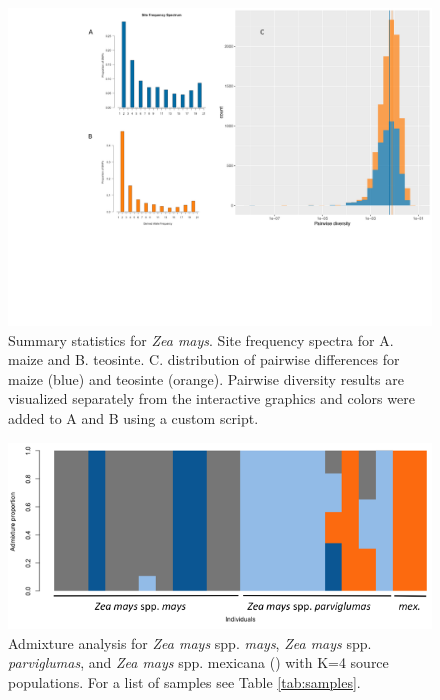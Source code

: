 \documentclass[10pt,a4paper]{article}
\newcommand{\jri}[1]{\todo[size=\scriptsize, color=flame]{#1}}
\begin{document}
\begin{figure}
\centering
\includegraphics[width=\linewidth]{figures/figure3big.pdf}
\caption{Summary statistics for {\it Zea mays}. Site frequency spectra for A. maize and B. teosinte. C. distribution of pairwise differences for maize (blue) and teosinte (orange). Pairwise diversity results are visualized separately from the interactive graphics and colors were added to A and B using a custom script.}
\label{fig:figure3}
\end{figure}

\begin{figure}
\centering
\includegraphics[width=\linewidth]{figures/mt4labeled.png}
\caption{Admixture analysis for {\it Zea mays} spp. {\it mays}, {\it Zea mays} spp. {\it parviglumas}, and {\it Zea mays} spp. {mexicana} () with K=4 source populations. For a list of samples see Table \ref{tab:samples}. }
\label{fig:admixture}
\end{figure}

\end{document}

